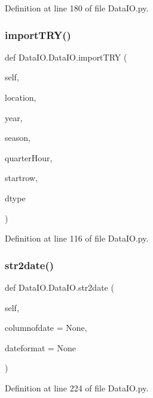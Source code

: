 Definition at line 180 of file Data\+I\+O.\+py.

\mbox{\label{class_data_i_o_1_1_data_i_o_a232251f90f75e5e8e307a035f191d1c4}} 
\subsubsection{\texorpdfstring{import\+T\+R\+Y()}{importTRY()}}
{\footnotesize\ttfamily def Data\+I\+O.\+Data\+I\+O.\+import\+T\+RY (\begin{DoxyParamCaption}\item[{}]{self,  }\item[{}]{location,  }\item[{}]{year,  }\item[{}]{season,  }\item[{}]{quarter\+Hour,  }\item[{}]{startrow,  }\item[{}]{dtype }\end{DoxyParamCaption})}



Definition at line 116 of file Data\+I\+O.\+py.

\mbox{\label{class_data_i_o_1_1_data_i_o_a59071592ed63d8d505677035fd5ebda1}} 
\subsubsection{\texorpdfstring{str2date()}{str2date()}}
{\footnotesize\ttfamily def Data\+I\+O.\+Data\+I\+O.\+str2date (\begin{DoxyParamCaption}\item[{}]{self,  }\item[{}]{columnofdate = {\ttfamily None},  }\item[{}]{dateformat = {\ttfamily None} }\end{DoxyParamCaption})}



Definition at line 224 of file Data\+I\+O.\+py.

\mbox{\label{class_data_i_o_1_1_data_i_o_ae42c01ae3b0f343c292cb199327106f5}} 
